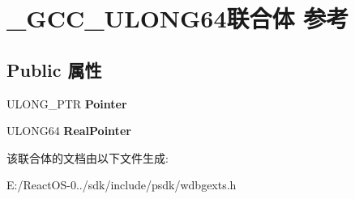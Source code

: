 \hypertarget{union___g_c_c___u_l_o_n_g64}{}\section{\+\_\+\+G\+C\+C\+\_\+\+U\+L\+O\+N\+G64联合体 参考}
\label{union___g_c_c___u_l_o_n_g64}
\subsection*{Public 属性}
\begin{DoxyCompactItemize}
\item 
\mbox{\label{union___g_c_c___u_l_o_n_g64_aaacc6347d2a6b8174988812e3223304f}} 
U\+L\+O\+N\+G\+\_\+\+P\+TR {\bfseries Pointer}
\item 
\mbox{\label{union___g_c_c___u_l_o_n_g64_a3d7b02bb5a4562b7fbd6b8047cac6f99}} 
U\+L\+O\+N\+G64 {\bfseries Real\+Pointer}
\end{DoxyCompactItemize}


该联合体的文档由以下文件生成\+:\begin{DoxyCompactItemize}
\item 
E\+:/\+React\+O\+S-\/0../sdk/include/psdk/wdbgexts.\+h\end{DoxyCompactItemize}
